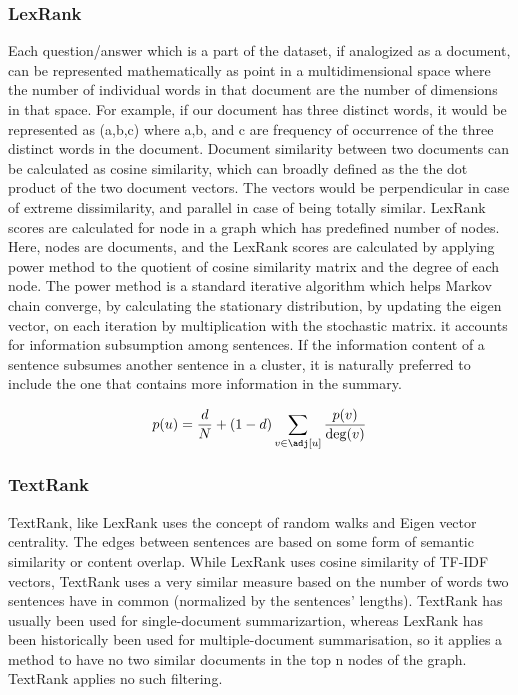 \documentclass[journal]{IEEEtran}
\begin{document}
\subsubsection{LexRank}
Each question/answer which is a part of the dataset, if analogized as a document, can be represented mathematically as point in a multidimensional space where the number of individual words in that document are the number of dimensions in that space. For example, if our document has three distinct words, it would be represented as (a,b,c) where a,b, and c are frequency of occurrence of the three distinct words in the document. Document similarity between two documents can be calculated as cosine similarity, which can broadly defined as the the dot product of the two document vectors. The vectors would be perpendicular in case of extreme dissimilarity, and parallel in case of being totally similar.
LexRank scores are calculated for node in a graph which has predefined number of nodes. Here, nodes are documents, and the LexRank scores are calculated by applying power method to the  quotient of cosine similarity matrix and the degree of each node. The power method is a standard iterative algorithm which helps Markov chain converge, by calculating the stationary distribution, by updating the eigen vector, on each iteration by multiplication with the stochastic matrix. it accounts for information subsumption among sentences. If the information content of a sentence subsumes another sentence in a cluster, it is naturally preferred to include the one that contains more information in the summary.

\begin{equation}
    p(u) = \frac{d}{N} + (1-d) \sum_{v\in \adj[u]}\frac{p(v)}{\deg(v)}
    
\end{equation}

\vspace{0.5cm}

\subsubsection{TextRank}
TextRank, like LexRank uses the concept of random walks and Eigen vector centrality. The edges between sentences are based on some form of semantic similarity or content overlap. While LexRank uses cosine similarity of TF-IDF vectors, TextRank uses a very similar measure based on the number of words two sentences have in common (normalized by the sentences' lengths). TextRank has usually been used for single-document summarizartion, whereas LexRank has been historically been used for multiple-document summarisation, so it applies a method to have no two similar documents in the top n nodes of the graph. TextRank applies no such filtering. 
\end{document}
